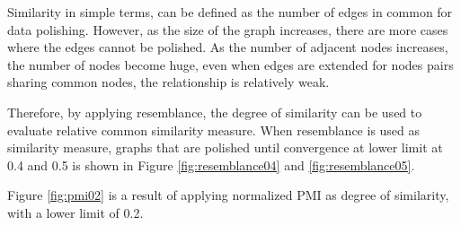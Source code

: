 Similarity in simple terms, can be defined as the  number of edges in common for data polishing. However, as the size of the graph increases, there are more cases where the edges cannot be polished. As the number of adjacent nodes increases, the number of nodes become huge, even when edges are extended for nodes pairs sharing common nodes, the relationship is relatively weak.  

Therefore, by applying resemblance, the degree of similarity can be used to evaluate relative common similarity measure. When resemblance is used as similarity measure,  graphs that are polished until convergence at lower limit at 0.4 and 0.5 is shown in Figure \ref{fig:resemblance04} and \ref{fig:resemblance05}.

Figure \ref{fig:pmi02} is a result of applying normalized PMI as degree of similarity, with a lower limit of 0.2.


